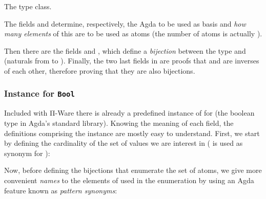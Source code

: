             \begin{listing}[ht]
                \caption{The  type class.\label{lst:atomic}}
            \end{listing}

            The fields  and  determine, respectively,
            the Agda  to be used as basis and \emph{how many elements} of this 
            are to be used as atoms (the number of atoms is actually  \AY{=}  ).

            Then there are the fields  and , which define a \emph{bijection}
            between the  type and   (naturals from  to ).
            Finally, the two last fields in  are proofs
            that  and  are inverses of each other,
            therefore proving that they are also bijections.

            \subsubsection{Instance for \texttt{Bool}}
            Included with Π-Ware there is already a predefined instance of  for 
            (the boolean type in Agda's standard library).
            Knowing the meaning of each field, the definitions comprising the instance
            are mostly easy to understand.
            First, we start by defining the cardinality of the set of values we are interest in
            ( is used as synonym for ):

            \begin{center}
            \end{center}

            Now, before defining the bijections that enumerate the set of atoms,
            we give more convenient \emph{names} to the elements of   used in the enumeration
            by using an Agda feature known as \emph{pattern synonyms}:

            \begin{center}
            \end{center}

